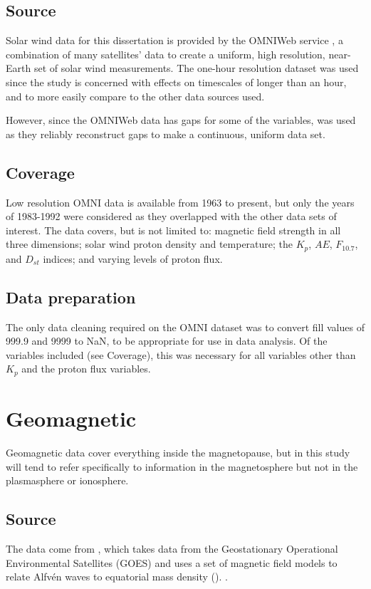 \subsection{Source}
Solar wind data for this dissertation is provided by the OMNIWeb service , a combination of many satellites' data to create a uniform, high resolution, near-Earth set of solar wind measurements. The one-hour resolution dataset was used since the study is concerned with effects on timescales of longer than an hour, and to more easily compare to the other data sources used. 

However, since the OMNIWeb data has gaps for some of the variables, \cite{Kondrashov2014ReconstructionOfGaps} was used as they reliably reconstruct gaps to make a continuous, uniform data set. 

\subsection{Coverage}
Low resolution OMNI data is available from 1963 to present, but only the years of 1983-1992 were considered as they overlapped with the other data sets of interest. The data covers, but is not limited to: magnetic field strength in all three dimensions; solar wind proton density and temperature; the $K_p$, $AE$, $F_{10.7}$, and $D_{st}$ indices; and varying levels of proton flux.

\subsection{Data preparation}
The only data cleaning required on the OMNI dataset was to convert fill values of 999.9 and 9999 to NaN, to be appropriate for use in data analysis. Of the variables included (see Coverage), this was necessary for all variables other than $K_p$ and the proton flux variables.

\section{Geomagnetic}
Geomagnetic data cover everything inside the magnetopause, but in this study will tend to refer specifically to information in the magnetosphere but not in the plasmasphere or ionosphere.

\subsection{Source}
The data come from \cite{Takahashi2010SolarCycleVariation}, which takes data from the Geostationary Operational Environmental Satellites (GOES) and uses a set of magnetic field models to relate Alfvén waves to equatorial mass density (\req). . 

